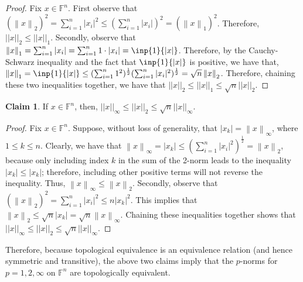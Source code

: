 \documentclass[letterpaper,12pt]{article}
\theoremstyle{definition}
\newtheorem{claim}[theorem]{Claim}
\newcommand{\norm}[1]{\left\lVert#1\right\rVert}
\begin{document}
\begin{proof}
	Fix $x\in \mathbb{F}^n$. First observe that $(\norm{x}_2)^2 = \sum_{i=1}^n |x_i|^2 \leq \left(\sum_{i=1}^n |x_i| \right)^2 = \left(\norm{x}_1\right)^2$. Therefore, $||x||_2 \leq ||x||_1$. Secondly, observe that $\norm{x}_1 = \sum_{i=1}^{n} |x_i| = \sum_{i=1}^{n} 1 \cdot |x_i| = \inp{1}{|x|}$. Therefore, by the Cauchy-Schwarz inequality and the fact that $\inp{1}{|x|}$ is positive, we have that, $\norm{x}_1 = \inp{1}{|x|} \leq (\sum_{i=1}^n 1^2)^{\frac{1}{2}} (\sum_{i=1}^n |x_i|^2)^{\frac{1}{2}} = \sqrt{n} \norm{x}_2$. Therefore, chaining these two inequalities together, we have that $||x||_2 \leq ||x||_1 \leq \sqrt{n} ||x||_2$.
\end{proof}

\begin{claim}
	If $x\in \mathbb{F}^n$, then, $||x||_{\infty} \leq ||x||_2 \leq \sqrt{n} ||x||_{\infty} $.
\end{claim}
\begin{proof}
	Fix $x\in \mathbb{F}^n$. Suppose, without loss of generality, that $|x_k| = \norm{x}_{\infty}$, where $1 \leq k \leq n$. Clearly, we have that $\norm{x}_{\infty} = |x_k| \leq ( \sum_{i=1}^n |x_i|^2)^{\frac{1}{2}} = \norm{x}_2$, because only including index $k$ in the sum of the 2-norm leads to the inequality $|x_k| \leq |x_k|$; therefore, including other positive terms will not reverse the inequality. Thus, $\norm{x}_{\infty} \leq \norm{x}_2$. Secondly, observe that $(\norm{x}_2)^2 = \sum_{i=1}^n |x_i|^2 \leq n |x_k|^2$. This implies that $\norm{x}_2 \leq \sqrt{n} |x_k| = \sqrt{n} \norm{x}_{\infty}$. Chaining these inequalities together shows that $||x||_{\infty} \leq ||x||_2 \leq \sqrt{n} ||x||_{\infty} $.
\end{proof}
Therefore, because topological equivalence is an equivalence relation (and hence symmetric and transitive), the above two claims imply that the $p$-norms for $p=1,2,\infty$ on $\mathbb{F}^n$ are topologically equivalent.
\end{document}
